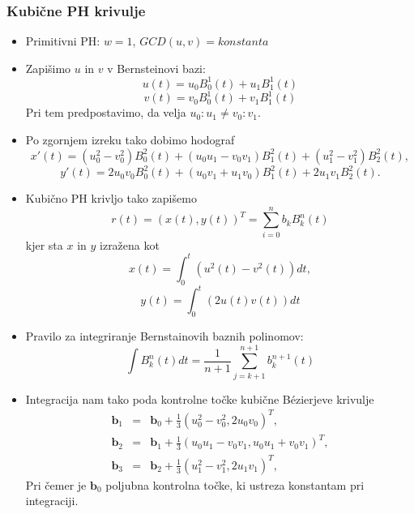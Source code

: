 \documentclass[12pt]{beamer}
\theoremstyle{definition} %
\theoremstyle{plain} %
\begin{document}
\begin{frame}
\frametitle{Kubične PH krivulje}
    \begin{itemize}
        \item Primitivni PH: $w=1$, $GCD(u, v) = konstanta$ %
        \item Zapišimo $u$ in $v$ v Bernsteinovi bazi:
              $$ u(t) = u_0 B_0^1(t) + u_1 B_1^1(t) $$
              $$ v(t) = v_0 B_0^1(t) + v_1 B_1^1(t) $$
              Pri tem predpostavimo, da velja $u_0 : u_1 \neq v_0 : v_1$.
        \item Po zgornjem izreku tako dobimo hodograf
              $$x'(t) = (u_0^2 - v_0^2)B_0^2(t) + (u_0 u_1 - v_0 v_1) B_1^2(t) + (u_1^2 - v_1^2) B_2^2(t),$$
              $$y'(t) = 2 u_0 v_0 B_0^2(t) + (u_0 v_1 + u_1 v_0) B_1^2(t) + 2 u_1 v_1 B_2^2(t).$$
    \end{itemize}
\end{frame}
\begin{frame}
    \begin{itemize}
        \item Kubično PH krivljo tako zapišemo 
              $$ r(t) = (x(t), y(t))^T = \sum_{i=0}^{n}{b_k B_k^n(t)} $$
              kjer sta $x$ in $y$ izražena kot
              $$x(t) = \int_0^t (u^2(t) - v^2(t)) dt,$$
              $$y(t) = \int_0^t (2u(t)v(t))dt$$
        \item Pravilo za integriranje Bernstainovih baznih polinomov:
              $$\int B^n_k(t) dt = \frac{1}{n+1} \sum_{j=k+1}^{n+1} b^{n+1}_k(t)$$
    \end{itemize}
\end{frame}

\begin{frame}
    \begin{itemize}
        \item Integracija nam tako poda kontrolne točke kubične B\'ezierjeve krivulje
                \begin{eqnarray}
                    \textbf{b}_1 &=& \textbf{b}_0 + \frac{1}{3}(u_0^2 - v_0^2, 2 u_0 v_0)^T,\nonumber\\
                    \textbf{b}_2 &=& \textbf{b}_1 + \frac{1}{3}(u_0 u_1 - v_0 v_1, u_0 u_1 + v_0 v_1)^T,\nonumber\\
                    \textbf{b}_3 &=& \textbf{b}_2 + \frac{1}{3} (u_1^2 - v_1^2, 2 u_1 v_1)^T,\nonumber
                \end{eqnarray}
              Pri čemer je $\textbf{b}_0$ poljubna kontrolna točke, ki ustreza konstantam pri integraciji.
    \end{itemize}
\end{frame}
\end{document}

